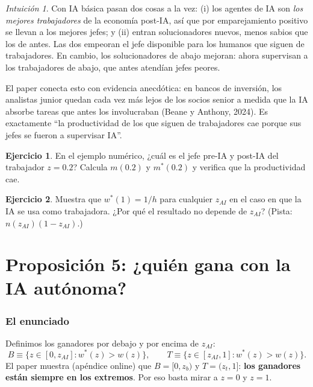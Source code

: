 \documentclass[11pt]{article}
\theoremstyle{definition}
\newtheorem{ejercicio}{Ejercicio}
\theoremstyle{remark}
\newtheorem*{intuicion}{Intuición}
\newcommand{\zai}{z_{AI}}
\begin{document}
\begin{intuicion}
Con IA básica pasan dos cosas a la vez: (i) los agentes de IA son \emph{los mejores trabajadores} de la
economía post-IA, así que por emparejamiento positivo se llevan a los mejores jefes; y (ii) entran
solucionadores nuevos, menos sabios que los de antes. Las dos empeoran el jefe disponible para los
humanos que siguen de trabajadores. En cambio, los solucionadores de abajo mejoran: ahora supervisan
a los trabajadores de abajo, que antes atendían jefes peores.
\end{intuicion}

El paper conecta esto con evidencia anecdótica: en bancos de inversión, los analistas junior quedan cada
vez más lejos de los socios senior a medida que la IA absorbe tareas que antes los involucraban
(Beane y Anthony, 2024). Es exactamente ``la productividad de los que siguen de trabajadores cae
porque sus jefes se fueron a supervisar IA''.

\begin{ejercicio}
En el ejemplo numérico, ¿cuál es el jefe pre-IA y post-IA del trabajador $z=0.2$? Calcula $m(0.2)$ y
$m^{*}(0.2)$ y verifica que la productividad cae.
\end{ejercicio}

\begin{ejercicio}
Muestra que $w^{*}(1)=1/h$ para cualquier $\zai$ en el caso en que la IA se usa como trabajadora.
¿Por qué el resultado no depende de $\zai$? (Pista: $n(\zai)(1-\zai)$.)
\end{ejercicio}

\part{Proposición 5: ¿quién gana con la IA autónoma?}

\section{El enunciado}

Definimos los ganadores por debajo y por encima de $\zai$:
\[
  B\equiv\{z\in[0,\zai] : w^{*}(z)>w(z)\},\qquad T\equiv\{z\in[\zai,1] : w^{*}(z)>w(z)\}.
\]
El paper muestra (apéndice online) que $B=[0,z_b)$ y $T=(z_t,1]$: \textbf{los ganadores están siempre en
los extremos}. Por eso basta mirar a $z=0$ y $z=1$.
\end{document}

